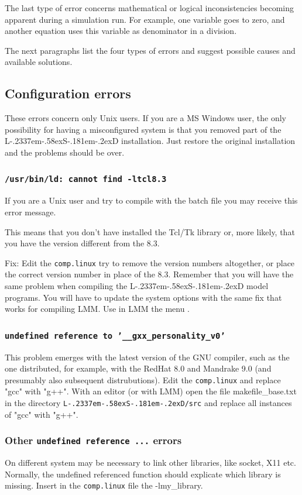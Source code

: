 \documentclass [11pt,a4paper] {book}
\def\LsD{{L\kern-.2337em\lower-.58ex\hbox{S}\kern-.181em\lower-.2ex\hbox{D}}\xspace}
\begin{document}
The last type of error concerns mathematical or logical inconsistencies becoming apparent
during a simulation run. For example, one variable goes to zero, and another equation
uses this variable as denominator in a division.

The next paragraphs list the four types of errors and suggest possible causes and
available solutions.

\subsection{Configuration errors}

These errors concern only Unix users. If you are a MS Windows user, the only possibility
for having a misconfigured system is that you removed part of the \LsD installation. Just
restore the original installation and the problems should be over.

\subsubsection{\texttt{/usr/bin/ld: cannot find -ltcl8.3} }
If you are a Unix user and try to compile with the batch file you may receive this error
message.

 This means that you don't have installed the Tcl/Tk library or, more likely, that you
 have the version different from the 8.3.

 Fix: Edit the \texttt{comp.linux} try to remove the version numbers altogether, or place the correct version number
 in place of the 8.3. Remember that you will have the same problem when compiling the
 \LsD model programs. You will have to update the system options with the same fix
 that works for compiling LMM. Use in LMM the menu .

\subsubsection{\texttt{undefined reference to '\_\_gxx\_personality\_v0'}}

This problem emerges with the latest version of the GNU compiler, such as the one
distributed, for example, with the RedHat 8.0 and Mandrake 9.0 (and presumably also
subsequent distrubutions). Edit the \texttt{comp.linux} and replace "gcc" with "g++".
With an editor (or with LMM) open the file makefile\_base.txt in the directory
\texttt{\LsD/src} and replace all instances of "gcc" with "g++".

\subsubsection{Other \texttt{undefined reference ...} errors} On different system may be
necessary to link other libraries, like socket, X11 etc. Normally, the undefined
referenced function should explicate which library is missing. Insert in the
\texttt{comp.linux} file the -lmy\_library.
\end{document}

